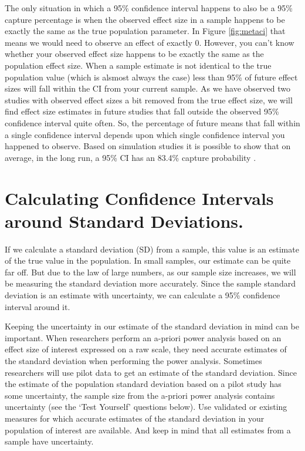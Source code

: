 \documentclass[
]{krantz}
\begin{document}
The only situation in which a 95\% confidence interval happens to also be a 95\% capture percentage is when the observed effect size in a sample happens to be exactly the same as the true population parameter. In Figure \ref{fig:metaci} that means we would need to observe an effect of exactly 0. However, you can't know whether your observed effect size happens to be exactly the same as the population effect size. When a sample estimate is not identical to the true population value (which is alsmost always the case) less than 95\% of future effect sizes will fall within the CI from your current sample. As we have observed two studies with observed effect sizes a bit removed from the true effect size, we will find effect size estimates in future studies that fall outside the observed 95\% confidence interval quite often. So, the percentage of future means that fall within a single confidence interval depends upon which single confidence interval you happened to observe. Based on simulation studies it is possible to show that on average, in the long run, a 95\% CI has an 83.4\% capture probability \citep{cumming_confidence_2006}.

\hypertarget{calculating-confidence-intervals-around-standard-deviations.}{%
\section{Calculating Confidence Intervals around Standard Deviations.}\label{calculating-confidence-intervals-around-standard-deviations.}}

If we calculate a standard deviation (SD) from a sample, this value is an
estimate of the true value in the population. In small samples, our estimate can be quite far off. But due to the law of large numbers, as our sample size increases, we will be measuring the standard deviation more accurately. Since the sample standard deviation is an estimate with uncertainty, we can calculate a 95\% confidence interval around it.

Keeping the uncertainty in our estimate of the standard deviation in mind can be important. When researchers perform an a-priori power analysis based on an effect size of interest expressed on a raw scale, they need accurate estimates of the standard deviation when performing the power analysis. Sometimes researchers will use pilot data to get an estimate of the standard deviation. Since the estimate of the population standard deviation based on a pilot study has some uncertainty, the sample size from the a-priori power analysis contains uncertainty (see the `Test Yourself' questions below). Use validated or existing measures for which accurate estimates of the standard deviation in your population of interest are available. And keep in mind that all estimates from a sample have uncertainty.
\end{document}

